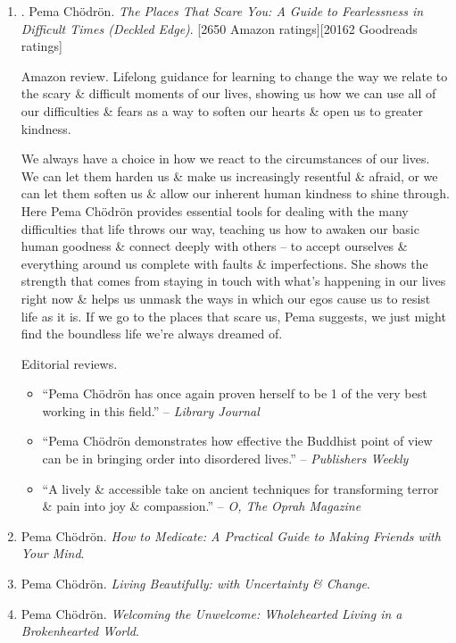 \documentclass{article}
\begin{document}
\begin{enumerate}
	\item \cite{Chodron_scare}. {\sc Pema Ch\"odr\"on}. {\it The Places That Scare You: A Guide to Fearlessness in Difficult Times (Deckled Edge)}. [2650 Amazon ratings][20162 Goodreads ratings]

	{\sf Amazon review.} Lifelong guidance for learning to change the way we relate to the scary \& difficult moments of our lives, showing us how we can use all of our difficulties \& fears as a way to soften our hearts \& open us to greater kindness.

	We always have a choice in how we react to the circumstances of our lives. We can let them harden us \& make us increasingly resentful \& afraid, or we can let them soften us \& allow our inherent human kindness to shine through. Here {\sc Pema Ch\"odr\"on} provides essential tools for dealing with the many difficulties that life throws our way, teaching us how to awaken our basic human goodness \& connect deeply with others -- to accept ourselves \& everything around us complete with faults \& imperfections. She shows the strength that comes from staying in touch with what's happening in our lives right now \& helps us unmask the ways in which our egos cause us to resist life as it is. If we go to the places that scare us, {\sc Pema} suggests, we just might find the boundless life we're always dreamed of.

	{\sf Editorial reviews.}
	\begin{itemize}
		\item ``{\sc Pema Ch\"odr\"on} has once again proven herself to be 1 of the very best working in this field.'' -- {\it Library Journal}
		\item ``{\sc Pema Ch\"odr\"on} demonstrates how effective the Buddhist point of view can be in bringing order into disordered lives.'' -- {\it Publishers Weekly}
		\item ``A lively \& accessible take on ancient techniques for transforming terror \& pain into joy \& compassion.'' -- {\it O, The Oprah Magazine}
	\end{itemize}

	\item {\sc Pema Ch\"odr\"on}. {\it How to Medicate: A Practical Guide to Making Friends with Your Mind}.

	\item {\sc Pema Ch\"odr\"on}. {\it Living Beautifully: with Uncertainty \& Change}.

	\item {\sc Pema Ch\"odr\"on}. {\it Welcoming the Unwelcome: Wholehearted Living in a Brokenhearted World}.


\end{enumerate}
\end{document}

